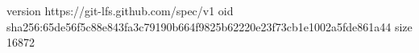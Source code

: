 version https://git-lfs.github.com/spec/v1
oid sha256:65de56f5c88e843fa3c79190b664f9825b62220e23f73cb1e1002a5fde861a44
size 16872
